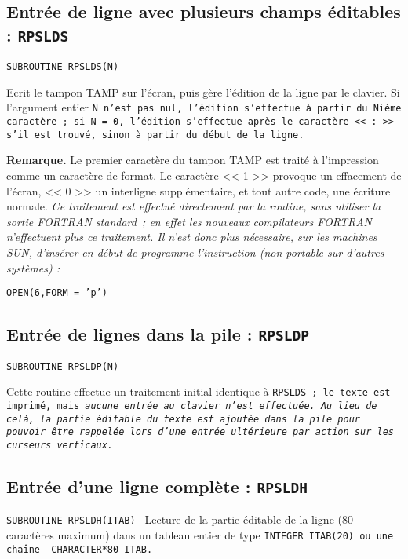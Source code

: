 \documentclass[a4paper,12pt,titlepage]{article}
\newcommand{\fsub}[1]{\hbox {\tt SUBROUTINE #1  } \medskip }
\begin{document}
\subsection{Entr\'ee de ligne avec plusieurs champs \'editables : \tt RPSLDS}
\fsub{RPSLDS(N)}

                   Ecrit le tampon TAMP sur l'\'ecran, puis
		   g\`ere l'\'edition de la ligne par le clavier.  Si
		   l'argument entier \tt N\rm\ n'est pas nul, l'\'edition
		   s'effectue \`a partir du \tt N\rm i\`eme caract\`ere ; si
		   \tt N\rm\ = 0, l'\'edition s'effectue apr\`es le
		   caract\`ere << : >> s'il est trouv\'e, sinon \`a partir du
		   d\'ebut de la ligne.

   {\bf Remarque.} Le premier caract\`ere du tampon TAMP est trait\'e \`a
l'impression comme un caract\`ere de format. Le caract\`ere << 1 >> provoque
un effacement de l'\'ecran, << 0 >> un interligne suppl\'ementaire, et tout
autre code, une \'ecriture normale. \em Ce traitement est effectu\'e
directement par la routine, sans utiliser la sortie FORTRAN standard\em\ ; en
effet les nouveaux compilateurs FORTRAN n'effectuent plus ce traitement. Il
n'est donc plus n\'ecessaire, sur les machines SUN, d'ins\'erer en d\'ebut
de programme l'instruction (non por\-ta\-ble sur d'au\-tres sys\-t\`e\-mes) :

   \begin{center}
                   \tt OPEN(6,FORM = 'p')\rm
   \end{center}

\subsection{Entr\'ee de lignes dans la pile : \tt RPSLDP}
\fsub{   RPSLDP(N)}

Cette routine effectue un traitement initial identique \`a \tt RPSLDS\rm\ ;
le texte est imprim\'e, mais \em aucune entr\'ee au clavier n'est
effectu\'ee\em. Au lieu de cel\`a, la partie \'editable du texte est ajout\'ee
dans la pile pour pouvoir \^etre rappel\'ee lors d'une entr\'ee ult\'erieure
par action sur les curseurs verticaux.

\subsection{Entr\'ee d'une ligne compl\`ete : \tt RPSLDH}
\fsub{  RPSLDH(ITAB)}
                   Lecture de la partie \'editable de la
		   ligne (80 caract\`eres maximum) dans un tableau entier de
		   type \tt INTEGER~ITAB(20)\rm\ ou une cha\^{\i}ne \tt
                   CHARACTER*80~ITAB\rm .
\end{document}
